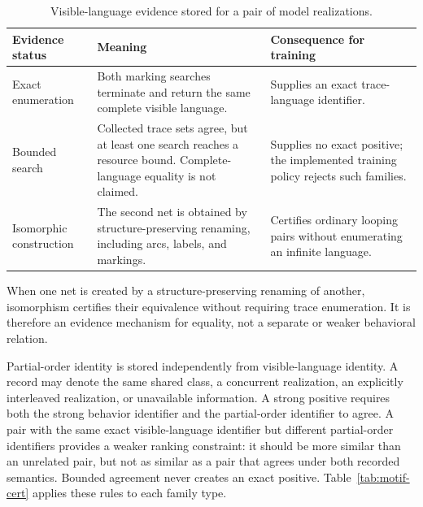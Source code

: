 \documentclass[pdflatex,sn-basic]{sn-jnl}
\begin{document}
\begin{table}[!t]
\centering
\caption{Visible-language evidence stored for a pair of model realizations.}
\label{tab:relation-evidence}
\begin{tabularx}{\textwidth}{@{}>{\raggedright\arraybackslash}p{}Y>{\raggedright\arraybackslash}p{0.28\textwidth}@{}}
\toprule
Evidence status & Meaning & Consequence for training \\
\midrule
Exact enumeration & Both marking searches terminate and return the same complete visible language. & Supplies an exact trace-language identifier. \\
Bounded search & Collected trace sets agree, but at least one search reaches a resource bound. Complete-language equality is not claimed. & Supplies no exact positive; the implemented training policy rejects such families. \\
Isomorphic construction & The second net is obtained by structure-preserving renaming, including arcs, labels, and markings. & Certifies ordinary looping pairs without enumerating an infinite language. \\
\bottomrule
\end{tabularx}
\end{table}

When one net is created by a structure-preserving renaming of another, isomorphism certifies their equivalence without requiring trace enumeration. It is therefore an evidence mechanism for equality, not a separate or weaker behavioral relation.

Partial-order identity is stored independently from visible-language identity. A record may denote the same shared class, a concurrent realization, an explicitly interleaved realization, or unavailable information. A strong positive requires both the strong behavior identifier and the partial-order identifier to agree. A pair with the same exact visible-language identifier but different partial-order identifiers provides a weaker ranking constraint: it should be more similar than an unrelated pair, but not as similar as a pair that agrees under both recorded semantics. Bounded agreement never creates an exact positive. Table~\ref{tab:motif-cert} applies these rules to each family type.
\end{document}
